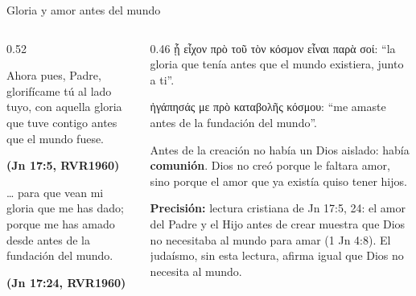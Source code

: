 \documentclass[hyperref={bookmarks=false},aspectratio=169]{beamer}
\newcommand{\grc}[1]{\foreignlanguage{ancientgreek}{#1}}
\newcommand{\fuente}[1]{\par\hfill{\upshape\bfseries\footnotesize\textcolor{azul}{#1}}}
\newcommand{\precision}[1]{{\footnotesize\color{gris}\textbf{Precisión:} #1}}
\begin{document}
\begin{frame}{Gloria y amor antes del mundo}
\begin{columns}[t,onlytextwidth]
\begin{column}{0.52\textwidth}
\begin{cita}Ahora pues, Padre, glorifícame tú al lado tuyo, con aquella gloria que tuve contigo antes que el mundo fuese.\fuente{(Jn 17:5, RVR1960)}\end{cita}
\begin{cita}\ldots{} para que vean mi gloria que me has dado; porque me has amado desde antes de la fundación del mundo.\fuente{(Jn 17:24, RVR1960)}\end{cita}
\end{column}
\begin{column}{0.46\textwidth}\scriptsize
\grc{ᾗ εἶχον πρὸ τοῦ τὸν κόσμον εἶναι παρὰ σοί}: ``la gloria que tenía antes que el mundo existiera, junto a ti''.\par\smallskip
\grc{ἠγάπησάς με πρὸ καταβολῆς κόσμου}: ``me amaste antes de la fundación del mundo''.\par\medskip
\begin{tcolorbox}[colback=azul,colframe=dorado,boxrule=1.2pt,arc=3pt,coltext=papiro]
\small Antes de la creación no había un Dios aislado: había \textbf{comunión}. Dios no creó porque le faltara amor, sino porque el amor que ya existía quiso tener hijos.
\end{tcolorbox}
\precision{lectura cristiana de Jn 17:5, 24: el amor del Padre y el Hijo antes de crear muestra que Dios no necesitaba al mundo para amar (1 Jn 4:8). El judaísmo, sin esta lectura, afirma igual que Dios no necesita al mundo.}
\end{column}
\end{columns}
\end{frame}
\end{document}
